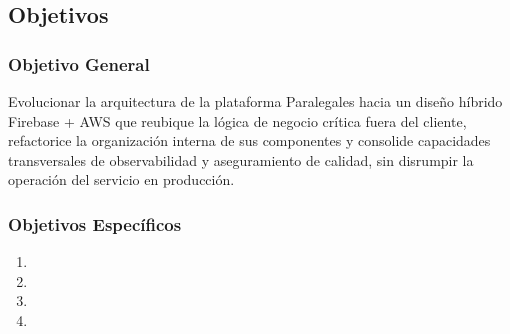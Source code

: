 \subsection{Objetivos}

\subsubsection{Objetivo General}
Evolucionar la arquitectura de la plataforma Paralegales hacia un diseño híbrido Firebase + AWS que reubique la lógica de negocio crítica fuera del cliente, refactorice la organización interna de sus componentes y consolide capacidades transversales de observabilidad y aseguramiento de calidad, sin disrumpir la operación del servicio en producción.

\subsubsection{Objetivos Específicos}

\begin{enumerate}
  \item \objetivoEspecificoA
  \item \objetivoEspecificoB
  \item \objetivoEspecificoC
  \item \objetivoEspecificoD
\end{enumerate}
